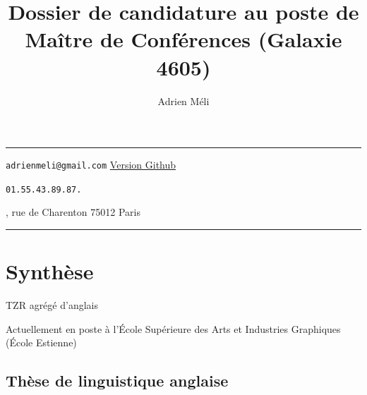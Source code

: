 \documentclass[
  10pt,
]{article}
\title{Dossier de candidature au poste de Maître de Conférences (Galaxie 4605)}
\author{Adrien Méli}
\date{}
\begin{document}
\maketitle

{
\setcounter{tocdepth}{1}
\tableofcontents
}
\begin{center}\rule{0.5\linewidth}{0.5pt}\end{center}

\quad \faEnvira \quad \texttt{adrienmeli@gmail.com} \quad \textbar{} \href{https://adrienmeli.github.io/cv/}{Version Github \quad \faGithub \quad}

\quad \faPhone \quad \texttt{01.55.43.89.87.}

\quad \faEnvelope {}, rue de Charenton 75012 Paris

\begin{center}\rule{0.5\linewidth}{0.5pt}\end{center}

\pagebreak

\hypertarget{synthuxe8se}{%
\section{Synthèse}\label{synthuxe8se}}

TZR agrégé d'anglais

Actuellement en poste à l'École Supérieure des Arts et Industries Graphiques (École Estienne)

\hypertarget{thuxe8se-de-linguistique-anglaise}{%
\subsection{Thèse de linguistique anglaise}\label{thuxe8se-de-linguistique-anglaise}}
\end{document}
